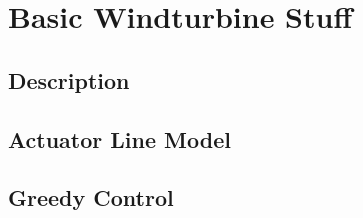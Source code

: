 \chapter{Basic Windturbine Stuff}
\section{Description}
\section{Actuator Line Model}
\section{Greedy Control}